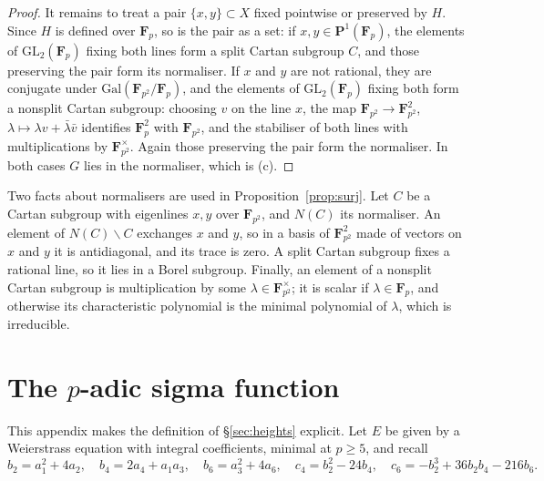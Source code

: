 \documentclass[11pt]{amsart}
\theoremstyle{definition}
\newcommand{\F}{\mathbf{F}}
\newcommand{\GL}{\mathrm{GL}}
\newcommand{\Gal}{\mathrm{Gal}}
\begin{document}
\begin{proof}
It remains to treat a pair $\{x,y\}\subset X$ fixed pointwise or preserved by $H$. Since $H$ is defined over $\F_p$, so is the pair as a set: if $x,y\in\mathbf P^1(\F_p)$, the elements of $\GL_2(\F_p)$ fixing both lines form a split Cartan subgroup $C$, and those preserving the pair form its normaliser. If $x$ and $y$ are not rational, they are conjugate under $\Gal(\F_{p^2}/\F_p)$, and the elements of $\GL_2(\F_p)$ fixing both form a nonsplit Cartan subgroup: choosing $v$ on the line $x$, the map $\F_{p^2}\to\F_{p^2}^2$, $\lambda\mapsto\lambda v+\bar\lambda\bar v$ identifies $\F_p^2$ with $\F_{p^2}$, and the stabiliser of both lines with multiplications by $\F_{p^2}^\times$. Again those preserving the pair form the normaliser. In both cases $G$ lies in the normaliser, which is (c).
\end{proof}

Two facts about normalisers are used in Proposition~\ref{prop:surj}. Let $C$ be a Cartan subgroup with eigenlines $x,y$ over $\F_{p^2}$, and $N(C)$ its normaliser. An element of $N(C)\smallsetminus C$ exchanges $x$ and $y$, so in a basis of $\F_{p^2}^2$ made of vectors on $x$ and $y$ it is antidiagonal, and its trace is zero. A split Cartan subgroup fixes a rational line, so it lies in a Borel subgroup. Finally, an element of a nonsplit Cartan subgroup is multiplication by some $\lambda\in\F_{p^2}^\times$; it is scalar if $\lambda\in\F_p$, and otherwise its characteristic polynomial is the minimal polynomial of $\lambda$, which is irreducible.

\section{The \texorpdfstring{$p$}{p}-adic sigma function}\label{app:sigma}

This appendix makes the definition of \S\ref{sec:heights} explicit. Let $E$ be given by a Weierstrass equation with integral coefficients, minimal at $p\ge5$, and recall
\[
b_2=a_1^2+4a_2,\quad b_4=2a_4+a_1a_3,\quad b_6=a_3^2+4a_6,\quad c_4=b_2^2-24b_4,\quad c_6=-b_2^3+36b_2b_4-216b_6 .
\]
\end{document}
